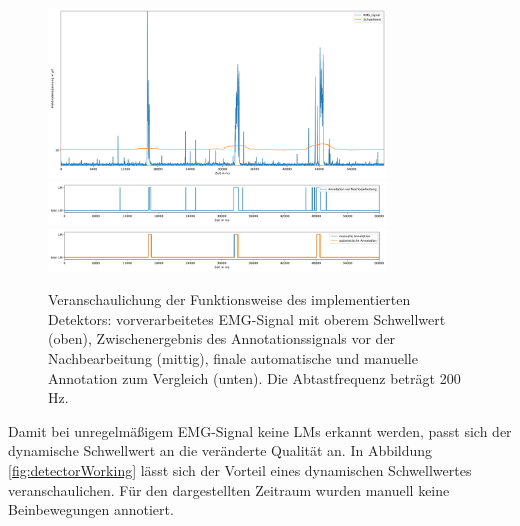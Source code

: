 \begin{figure}[!ht]%
	\begin{center}
	\includegraphics[width=0.80\textwidth]{./Bilder/detectorWorkEMGacq_002944221.edf2870000,60000.jpg}
	\includegraphics[width=0.80\textwidth]{./Bilder/detectorWork2acq_002944221.edf2870000,60000.jpg}
	\includegraphics[width=0.80\textwidth]{./Bilder/detectorWorkacq_002944221.edf2870000,60000.jpg}
	\end{center}
	\caption{Veranschaulichung der Funktionsweise des implementierten Detektors: vorverarbeitetes EMG-Signal mit oberem Schwellwert (oben), Zwischenergebnis des Annotationssignals vor der Nachbearbeitung (mittig), finale automatische und manuelle Annotation zum Vergleich (unten). Die Abtastfrequenz beträgt 200 Hz.}%
	\label{fig:detectorWorking2}%
\end{figure}

Damit bei unregelmäßigem EMG-Signal keine \glspl{LM} erkannt werden, passt sich der dynamische Schwellwert an die veränderte Qualität an. 
In Abbildung \ref{fig:detectorWorking} lässt sich der Vorteil eines dynamischen Schwellwertes veranschaulichen. Für den dargestellten Zeitraum wurden manuell keine Beinbewegungen annotiert.

